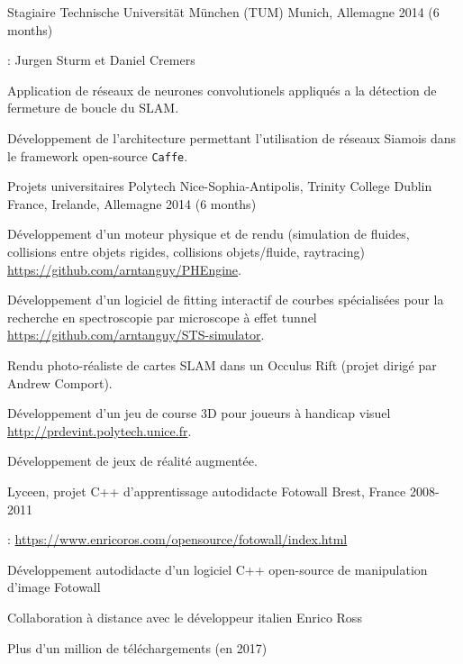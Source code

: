 \begin{cventries}
  \cventry
    {Stagiaire} %
    {Technische Universität München (TUM)} %
    {Munich, Allemagne} %
    {2014 (6 months)} %
    {
      \begin{cvitems} %
        \item {}: Jurgen Sturm et Daniel Cremers
        \item Application de réseaux de neurones convolutionels appliqués a la détection de fermeture de boucle du SLAM.
        \item Développement de l'architecture permettant l'utilisation de réseaux Siamois dans le framework open-source {\tt Caffe}.
      \end{cvitems}
    }

  \cventry
    {Projets universitaires} %
    {Polytech Nice-Sophia-Antipolis, Trinity College Dublin} %
    {France, Irelande, Allemagne} %
    {2014 (6 months)} %
    {
      \begin{cvitems} %
        \item Développement d'un moteur physique et de rendu (simulation de fluides, collisions entre objets rigides, collisions objets/fluide, raytracing)\\\url{https://github.com/arntanguy/PHEngine}.
        \item Développement d'un logiciel de fitting interactif de courbes spécialisées pour la recherche en spectroscopie par microscope à effet tunnel\\\url{https://github.com/arntanguy/STS-simulator}. 
        \item Rendu photo-réaliste de cartes SLAM dans un Occulus Rift (projet dirigé par Andrew Comport).
        \item Développement d'un jeu de course 3D pour joueurs à handicap visuel\\\url{http://prdevint.polytech.unice.fr}. 
        \item Développement de jeux de réalité augmentée.
      \end{cvitems}
    }

  \cventry
    {Lyceen, projet C++ d'apprentissage autodidacte} %
    {Fotowall} %
    {Brest, France} %
    {2008-2011} %
    {
      \begin{cvitems} %
        \item {}: \url{https://www.enricoros.com/opensource/fotowall/index.html}
        \item Développement autodidacte d'un logiciel C++ open-source de manipulation d'image Fotowall
        \item Collaboration à distance avec le développeur italien Enrico Ross
        \item Plus d'un million de téléchargements (en 2017)
      \end{cvitems}
    }

\end{cventries}
